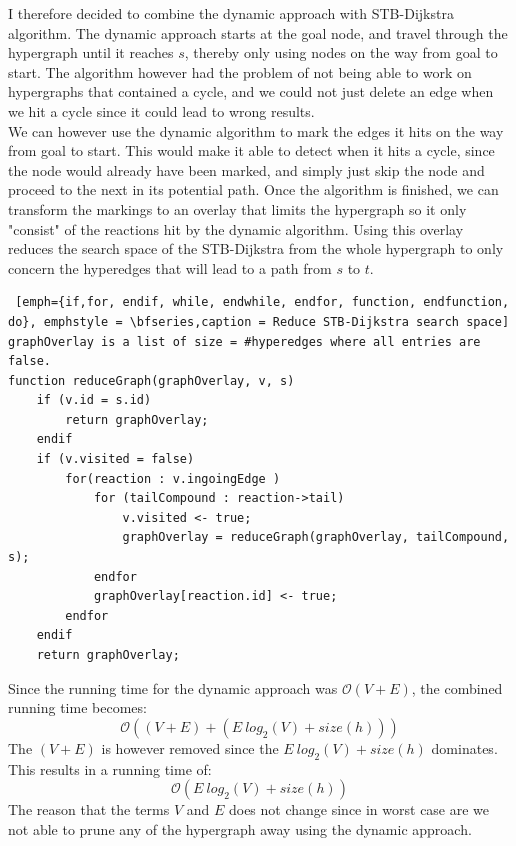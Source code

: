 \documentclass[a4paper,10pt,titlepage]{paper}
\begin{document}
I therefore decided to combine the dynamic approach with STB-Dijkstra algorithm. The dynamic approach starts at the goal node, and travel through the hypergraph until it reaches $s$, thereby only using nodes on the way from goal to start. The algorithm however had the problem of not being able to work on hypergraphs that contained a cycle, and we could not just delete an edge when we hit a cycle since it could lead to wrong results.\\
We can however use the dynamic algorithm to mark the edges it hits on the way from goal to start. This would make it able to detect when it hits a cycle, since the node would already have been marked, and simply just skip the node and proceed to the next in its potential path. Once the algorithm is finished, we can transform the markings to an overlay that limits the hypergraph so it only "consist" of the reactions hit by the dynamic algorithm. Using this overlay reduces the search space of the STB-Dijkstra from the whole hypergraph to only concern the hyperedges that will lead to a path from $s$ to $t$.
\begin{lstlisting} [emph={if,for, endif, while, endwhile, endfor, function, endfunction, do}, emphstyle = \bfseries,caption = Reduce STB-Dijkstra search space]
graphOverlay is a list of size = #hyperedges where all entries are false.
function reduceGraph(graphOverlay, v, s)
	if (v.id = s.id)
		return graphOverlay;
	endif
	if (v.visited = false) 
		for(reaction : v.ingoingEdge )
			for (tailCompound : reaction->tail) 
				v.visited <- true;
				graphOverlay = reduceGraph(graphOverlay, tailCompound, s);
			endfor
			graphOverlay[reaction.id] <- true;
		endfor
	endif
	return graphOverlay;
\end{lstlisting}
Since the running time for the dynamic approach was $\mathcal{O}(V+E)$, the combined running time becomes: 
\begin{equation}
\mathcal{O}((V+E)+(E\ log_2 (V) + size(h)))
\end{equation}
The $(V+E)$ is however removed since the $E\ log_2 (V) + size(h)$ dominates. This results in a running time of:
\begin{equation}
\mathcal{O}(E\ log_2 (V) + size(h))
\end{equation}
The reason that the terms $V$ and $E$ does not change since in worst case are we not able to prune any of the hypergraph away using the dynamic approach.
\end{document}
